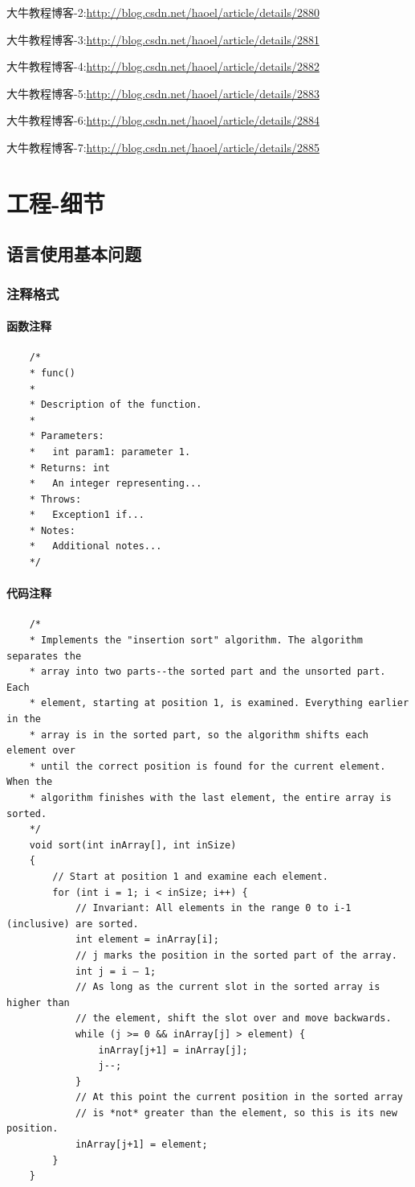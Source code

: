 \documentclass[UTF8,a4paper,12pt]{ctexbook} %
\begin{document}
			大牛教程博客-2:\url{http://blog.csdn.net/haoel/article/details/2880}
			
			大牛教程博客-3:\url{http://blog.csdn.net/haoel/article/details/2881}
			
			大牛教程博客-4:\url{http://blog.csdn.net/haoel/article/details/2882}
			
			大牛教程博客-5:\url{http://blog.csdn.net/haoel/article/details/2883}
			
			大牛教程博客-6:\url{http://blog.csdn.net/haoel/article/details/2884}
			
			大牛教程博客-7:\url{http://blog.csdn.net/haoel/article/details/2885}
\chapter{工程-细节}
\section{语言使用基本问题}
		\subsection{注释格式}
			\subsubsection{函数注释}
			\begin{lstlisting}
	/*
	* func()
	*
	* Description of the function.
	*
	* Parameters:
	* 	int param1: parameter 1.
	* Returns: int
	* 	An integer representing...
	* Throws:
	* 	Exception1 if...
	* Notes:
	* 	Additional notes...
	*/
			\end{lstlisting}
			\subsubsection{代码注释}
			\begin{lstlisting}
	/*
	* Implements the "insertion sort" algorithm. The algorithm separates the
	* array into two parts--the sorted part and the unsorted part. Each
	* element, starting at position 1, is examined. Everything earlier in the
	* array is in the sorted part, so the algorithm shifts each element over
	* until the correct position is found for the current element. When the
	* algorithm finishes with the last element, the entire array is sorted.
	*/
	void sort(int inArray[], int inSize)
	{
		// Start at position 1 and examine each element.
		for (int i = 1; i < inSize; i++) {
			// Invariant: All elements in the range 0 to i-1 (inclusive) are sorted.
			int element = inArray[i];
			// j marks the position in the sorted part of the array.
			int j = i – 1;
			// As long as the current slot in the sorted array is higher than
			// the element, shift the slot over and move backwards.
			while (j >= 0 && inArray[j] > element) {
				inArray[j+1] = inArray[j];
				j--;
			}
			// At this point the current position in the sorted array
			// is *not* greater than the element, so this is its new position.
			inArray[j+1] = element;
		}
	}
			\end{lstlisting}
\end{document}
